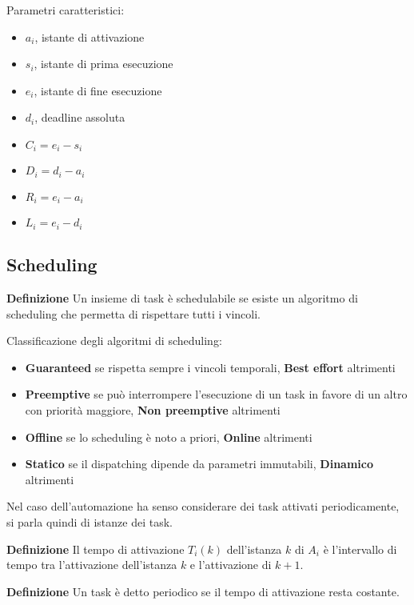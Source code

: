 \documentclass{article}
\newcommand{\df}[1]{\noindent\textbf{Definizione } #1.\newline}
\begin{document}
\noindent Parametri caratteristici:
\begin{multicols}{2}
\begin{itemize}
    \item $a_i$, istante di attivazione
    \item $s_i$, istante di prima esecuzione
    \item $e_i$, istante di fine esecuzione
    \item $d_i$, deadline assoluta
    \item $C_i=e_i-s_i$
    \item $D_i=d_i-a_i$
    \item $R_i=e_i-a_i$
    \item $L_i=e_i-d_i$
\end{itemize}
\end{multicols}

\subsection{Scheduling}

\df{Un insieme di task è schedulabile se esiste un algoritmo di scheduling che permetta di rispettare tutti i vincoli}

\noindent Classificazione degli algoritmi di scheduling:
\begin{itemize}
    \item \textbf{Guaranteed} se rispetta sempre i vincoli temporali, \textbf{Best effort} altrimenti
    \item \textbf{Preemptive} se può interrompere l'esecuzione di un task in favore di un altro con priorità maggiore, \textbf{Non preemptive} altrimenti
    \item \textbf{Offline} se lo scheduling è noto a priori, \textbf{Online} altrimenti
    \item \textbf{Statico} se il dispatching dipende da parametri immutabili, \textbf{Dinamico} altrimenti\newline
\end{itemize}

\noindent Nel caso dell'automazione ha senso considerare dei task attivati periodicamente, si parla quindi di istanze dei task.\newline

\df{Il tempo di attivazione $T_i(k)$ dell'istanza $k$ di $A_i$ è l'intervallo di tempo tra l'attivazione dell'istanza $k$ e l'attivazione di $k+1$}

\df{Un task è detto periodico se il tempo di attivazione resta costante}
\end{document}
